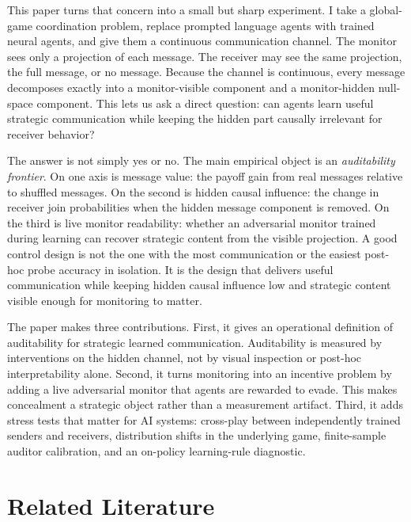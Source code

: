 \documentclass[11pt]{article}
\begin{document}
This paper turns that concern into a small but sharp experiment. I take a global-game coordination problem, replace prompted language agents with trained neural agents, and give them a continuous communication channel. The monitor sees only a projection of each message. The receiver may see the same projection, the full message, or no message. Because the channel is continuous, every message decomposes exactly into a monitor-visible component and a monitor-hidden null-space component. This lets us ask a direct question: can agents learn useful strategic communication while keeping the hidden part causally irrelevant for receiver behavior?

The answer is not simply yes or no. The main empirical object is an \emph{auditability frontier}. On one axis is message value: the payoff gain from real messages relative to shuffled messages. On the second is hidden causal influence: the change in receiver join probabilities when the hidden message component is removed. On the third is live monitor readability: whether an adversarial monitor trained during learning can recover strategic content from the visible projection. A good control design is not the one with the most communication or the easiest post-hoc probe accuracy in isolation. It is the design that delivers useful communication while keeping hidden causal influence low and strategic content visible enough for monitoring to matter.

The paper makes three contributions. First, it gives an operational definition of auditability for strategic learned communication. Auditability is measured by interventions on the hidden channel, not by visual inspection or post-hoc interpretability alone. Second, it turns monitoring into an incentive problem by adding a live adversarial monitor that agents are rewarded to evade. This makes concealment a strategic object rather than a measurement artifact. Third, it adds stress tests that matter for AI systems: cross-play between independently trained senders and receivers, distribution shifts in the underlying game, finite-sample auditor calibration, and an on-policy learning-rule diagnostic.

\section{Related Literature}
\end{document}
